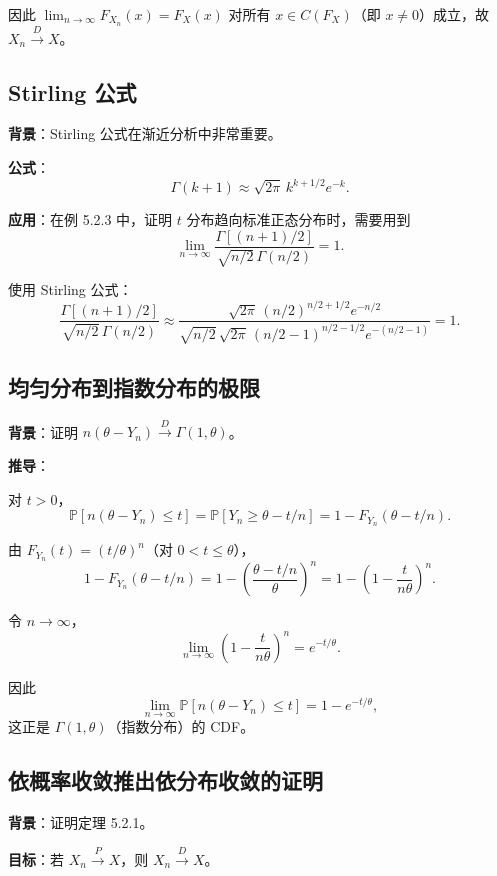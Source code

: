 因此 $\lim_{n \to \infty} F_{X_n}(x) = F_X(x)$ 对所有 $x \in C(F_X)$（即 $x \neq 0$）成立，故 $X_n \xrightarrow{D} X$。

\subsection{Stirling 公式}\label{sec:stirling-formula}

\textbf{背景}：Stirling 公式在渐近分析中非常重要。

\textbf{公式}：
\[
\Gamma(k + 1) \approx \sqrt{2\pi}\,k^{k+1/2}e^{-k}.
\label{eq:stirling}
\]

\textbf{应用}：在例 5.2.3 中，证明 $t$ 分布趋向标准正态分布时，需要用到
\[
\lim_{n \to \infty} \frac{\Gamma[(n+1)/2]}{\sqrt{n/2}\,\Gamma(n/2)} = 1.
\]

使用 Stirling 公式：
\[
\frac{\Gamma[(n+1)/2]}{\sqrt{n/2}\,\Gamma(n/2)} \approx \frac{\sqrt{2\pi}\,(n/2)^{n/2+1/2}e^{-n/2}}{\sqrt{n/2}\,\sqrt{2\pi}\,(n/2-1)^{n/2-1/2}e^{-(n/2-1)}} = 1.
\]

\subsection{均匀分布到指数分布的极限}\label{sec:uniform-to-exponential}

\textbf{背景}：证明 $n(\theta - Y_n) \xrightarrow{D} \Gamma(1, \theta)$。

\textbf{推导}：

对 $t > 0$，
\[
\mathbb{P}[n(\theta - Y_n) \leq t] = \mathbb{P}[Y_n \geq \theta - t/n] = 1 - F_{Y_n}(\theta - t/n).
\]

由 $F_{Y_n}(t) = (t/\theta)^n$（对 $0 < t \leq \theta$），
\[
1 - F_{Y_n}(\theta - t/n) = 1 - \left(\frac{\theta - t/n}{\theta}\right)^n = 1 - \left(1 - \frac{t}{n\theta}\right)^n.
\]

令 $n \to \infty$，
\[
\lim_{n \to \infty} \left(1 - \frac{t}{n\theta}\right)^n = e^{-t/\theta}.
\]

因此
\[
\lim_{n \to \infty} \mathbb{P}[n(\theta - Y_n) \leq t] = 1 - e^{-t/\theta},
\]
这正是 $\Gamma(1, \theta)$（指数分布）的 CDF。

\subsection{依概率收敛推出依分布收敛的证明}\label{sec:prob-to-dist-proof}

\textbf{背景}：证明定理 5.2.1。

\textbf{目标}：若 $X_n \xrightarrow{P} X$，则 $X_n \xrightarrow{D} X$。


